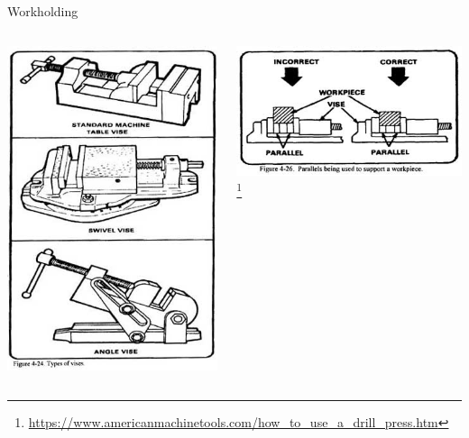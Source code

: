 \documentclass[aspectratio=169]{beamer}
\begin{document}
\begin{frame}{Workholding}
    \begin{columns}
        \begin{column}{0.5\textwidth}
            \centering
            \includegraphics[height=0.7\textheight]{drill_vises.jpg}
        \end{column}
        \begin{column}{0.5\textwidth}
            \centering
            \includegraphics[width=0.9\linewidth]{vise_parallels.jpg} \footnote{\url{https://www.americanmachinetools.com/how_to_use_a_drill_press.htm}}
        \end{column}
    \end{columns}
\end{frame}
\end{document}
